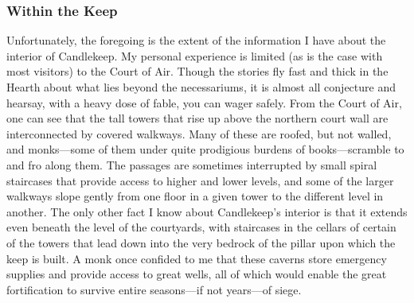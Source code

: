 \documentclass[10pt,a4paper,twoside,twocolumn,openany,bg=print,nodeprecatedcode]{dndbook}
\begin{document}
\subsubsection{Within the Keep}
Unfortunately, the foregoing is the extent of the information I have about the interior of Candlekeep. My personal experience is limited (as is the case with most visitors) to the Court of Air. Though the stories fly fast and thick in the Hearth about what lies beyond the necessariums, it is almost all conjecture and hearsay, with a heavy dose of fable, you can wager safely.
From the Court of Air, one can see that the tall towers that rise up above the northern court wall are interconnected by covered walkways. Many of these are roofed, but not walled, and monks—some of them under quite prodigious burdens of books—scramble to and fro along them. The passages are sometimes interrupted by small spiral staircases that provide access to higher and lower levels, and some of the larger walkways slope gently from one floor in a given tower to the different level in another.
The only other fact I know about Candlekeep's interior is that it extends even beneath the level of the courtyards, with staircases in the cellars of certain of the towers that lead down into the very bedrock of the pillar upon which the keep is built. A monk once confided to me that these caverns store emergency supplies and provide access to great wells, all of which would enable the great fortification to survive entire seasons—if not years—of siege.
\end{document}
